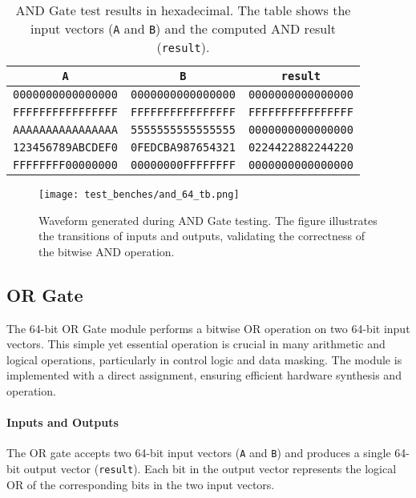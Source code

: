 \documentclass[12pt]{article}
\begin{document}
\begin{table}[ht!]
    \centering
    \renewcommand{\arraystretch}{1.1}
    \setlength{\tabcolsep}{4pt}
    \begin{tabular}{|c|c|c|}
        \hline
        \textbf{\texttt{A}} & \textbf{\texttt{B}} & \textbf{\texttt{result}} \\
        \hline
        \texttt{0000000000000000} & \texttt{0000000000000000} & \texttt{0000000000000000} \\
        \texttt{FFFFFFFFFFFFFFFF} & \texttt{FFFFFFFFFFFFFFFF} & \texttt{FFFFFFFFFFFFFFFF} \\
        \texttt{AAAAAAAAAAAAAAAA} & \texttt{5555555555555555} & \texttt{0000000000000000} \\
        \texttt{123456789ABCDEF0} & \texttt{0FEDCBA987654321} & \texttt{0224422882244220} \\
        \texttt{FFFFFFFF00000000} & \texttt{00000000FFFFFFFF} & \texttt{0000000000000000} \\
        \hline
    \end{tabular}
    \caption{AND Gate test results in hexadecimal. The table shows the input vectors (\texttt{A} and \texttt{B}) and the computed AND result (\texttt{result}).}
    \label{tab:and_results}
\end{table}

\begin{figure}[ht!]
    \centering
    \texttt{[image: test\_benches/and\_64\_tb.png]}
    \caption{Waveform generated during AND Gate testing. The figure illustrates the transitions of inputs and outputs, validating the correctness of the bitwise AND operation.}
    \label{fig:and_waveform}
\end{figure}

\subsection*{OR Gate}

The 64-bit OR Gate module performs a bitwise OR operation on two 64-bit input vectors. This simple yet essential operation is crucial in many arithmetic and logical operations, particularly in control logic and data masking. The module is implemented with a direct assignment, ensuring efficient hardware synthesis and operation.

\paragraph{Inputs and Outputs}
The OR gate accepts two 64-bit input vectors (\texttt{A} and \texttt{B}) and produces a single 64-bit output vector (\texttt{result}). Each bit in the output vector represents the logical OR of the corresponding bits in the two input vectors.
\end{document}
